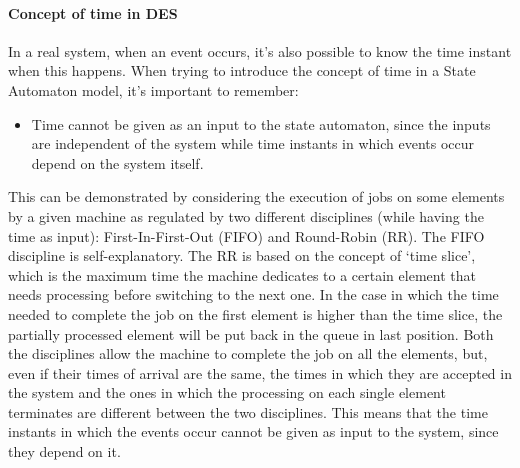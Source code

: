 \documentclass[12pt,a4paper]{article}
\begin{document}
\paragraph{Concept of time in DES} In a real system, when an event occurs, it’s also possible to know the time instant when this happens. When trying to introduce the concept of time in a State Automaton model, it’s important to remember:
\begin{itemize}
\item Time cannot be given as an input to the state automaton, since the inputs are independent of the system while time instants in which events occur depend on the system itself. 
\end{itemize}
This can be demonstrated by considering the execution of jobs on some elements by a given machine as regulated by two different disciplines (while having the time as input): First-In-First-Out (FIFO) and Round-Robin (RR). The FIFO discipline is self-explanatory. The RR is based on the concept of `time slice’, which is the maximum time the machine dedicates to a certain element that needs processing before switching to the next one. In the case in which the time needed to complete the job on the first element is higher than the time slice, the partially processed element will be put back in the queue in last position.
Both the disciplines allow the machine to complete the job on all the elements, but, even if their times of arrival are the same, the times in which they are accepted in the system and the ones in which the processing on each single element terminates are different between the two disciplines. This means that the time instants in which the events occur cannot be given as input to the system, since they depend on it.
\end{document}

